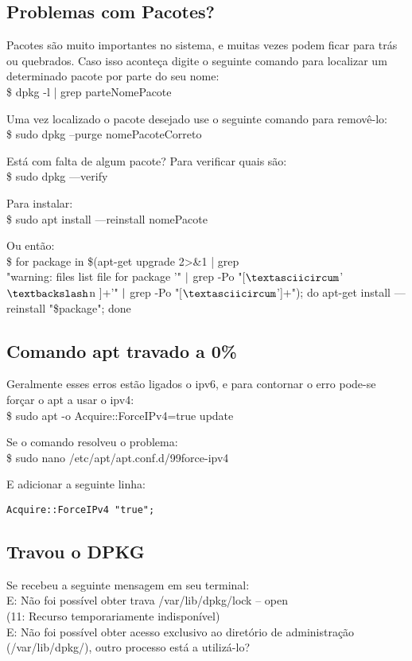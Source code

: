 \subsection{Problemas com Pacotes?}
Pacotes são muito importantes no sistema, e muitas vezes podem ficar para trás ou quebrados. Caso isso aconteça digite o seguinte comando para localizar um determinado pacote por parte do seu nome: \\
{\ttfamily\$ dpkg -l | grep parteNomePacote}

Uma vez localizado o pacote desejado use o seguinte comando para removê-lo: \\
{\ttfamily\$ sudo dpkg --purge nomePacoteCorreto}

Está com falta de algum pacote? Para verificar quais são: \\
{\ttfamily\$ sudo dpkg ---verify} 

Para instalar: \\
{\ttfamily\$ sudo apt install ---reinstall nomePacote}

Ou então: \\
{\ttfamily\$ for package in \$(apt-get upgrade 2>\&1 | grep \\ 
"warning: files list file for package '" $\arrowvert$ grep -Po "[$\textasciicircum$'$\textbackslash$n ]+'" $\arrowvert$ grep -Po "[$\textasciicircum$']+"); do apt-get install ---reinstall "\$package"; done}

\subsection{Comando apt travado a 0\%}
Geralmente esses erros estão ligados o ipv6, e para contornar o erro pode-se forçar o apt a usar o ipv4: \\
{\ttfamily\$ sudo apt -o Acquire::ForceIPv4=true update}

Se o comando resolveu o problema: \\
{\ttfamily\$ sudo nano /etc/apt/apt.conf.d/99force-ipv4}

E adicionar a seguinte linha:
\begin{lstlisting}
Acquire::ForceIPv4 "true";
\end{lstlisting}

\subsection{Travou o DPKG}
Se recebeu a seguinte mensagem em seu terminal: \\
{\ttfamily E: Não foi possível obter trava /var/lib/dpkg/lock – open \\ 
(11: Recurso temporariamente indisponível) \\
E: Não foi possível obter acesso exclusivo ao diretório de administração \\ 
(/var/lib/dpkg/), outro processo está a utilizá-lo?}

